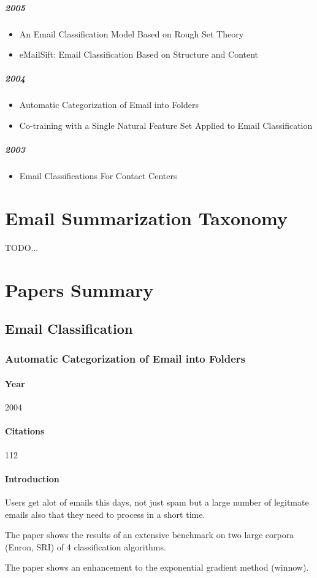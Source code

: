 \documentclass[12pt]{article}
\newenvironment{my_itemize}
{\begin{itemize}
  \setlength{\itemsep}{0cm}
  \setlength{\parskip}{0cm}}
{\end{itemize}}
\begin{document}
\subparagraph{2005}
\begin{itemize}
\item An Email Classification Model Based on Rough Set Theory
\item eMailSift: Email Classification Based on Structure and Content
\end{itemize}

\subparagraph{2004}
\begin{itemize}
\item Automatic Categorization of Email into Folders
\item Co-training with a Single Natural Feature Set Applied to Email Classification
\end{itemize}

\subparagraph{2003}
\begin{itemize}
\item Email Classifications For Contact Centers
\end{itemize}

\section{Email Summarization Taxonomy}
TODO...

\section{Papers Summary}
\subsection{Email Classification}

\subsubsection{Automatic Categorization of Email into Folders \cite{RON04}}

\paragraph{Year} 2004
\paragraph{Citations} 112
\paragraph{Introduction}
\begin{my_itemize}
  \item Users get alot of emails this days, not just spam but a large number of 
	legitmate emails also that they need to process in a short time.
  \item The paper shows the results of an extensive benchmark on two large corpora 
	(Enron, SRI) of 4 classification algorithms.
  \item The paper shows an enhancement to the exponential gradient method (winnow).
\end{my_itemize}
\end{document}
